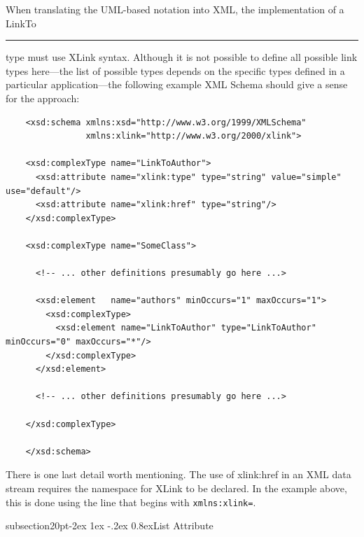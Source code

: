\documentclass[10pt]{article}
\makeatletter
\renewcommand{\subsection}{\@startsection%
  {subsection}{2}{0pt}{-2ex \@plus 1ex \@minus -.2ex}%
  {0.8ex}{\slshape\large\bfseries}}
\newcommand{\tightspacing}{\renewcommand{\baselinestretch}{0.85}}
\newcommand{\regularspacing}{\renewcommand{\baselinestretch}{1.0}}
\newcommand{\class}[1]{\textsf{#1}}
\newcommand{\attrib}[1]{\textsf{#1}}
\makeatother
\begin{document}
When translating the UML-based notation into XML, the implementation of a
\class{LinkTo}\rule{0.75in}{0.5pt} type must use XLink syntax.  Although it
is not possible to define all possible link types here---the list of
possible types depends on the specific types defined in a particular
application---the following example XML Schema should give a sense for the
approach:
\begin{small}
  \tightspacing
\begin{verbatim}
    <xsd:schema xmlns:xsd="http://www.w3.org/1999/XMLSchema"
                xmlns:xlink="http://www.w3.org/2000/xlink">
    
    <xsd:complexType name="LinkToAuthor">
      <xsd:attribute name="xlink:type" type="string" value="simple" use="default"/>
      <xsd:attribute name="xlink:href" type="string"/>
    </xsd:complexType>

    <xsd:complexType name="SomeClass">

      <!-- ... other definitions presumably go here ...>

      <xsd:element   name="authors" minOccurs="1" maxOccurs="1">
        <xsd:complexType>
          <xsd:element name="LinkToAuthor" type="LinkToAuthor" minOccurs="0" maxOccurs="*"/>
        </xsd:complexType>
      </xsd:element>

      <!-- ... other definitions presumably go here ...>

    </xsd:complexType>

    </xsd:schema>
\end{verbatim}
  \regularspacing
\end{small}

There is one last detail worth mentioning.  The use of \attrib{xlink:href}
in an XML data stream requires the namespace for XLink to be declared.  In
the example above, this is done using the line that begins with
\texttt{xmlns:xlink=}.


\subsection{List Attribute}
\label{sub:list-attributes}
\end{document}

